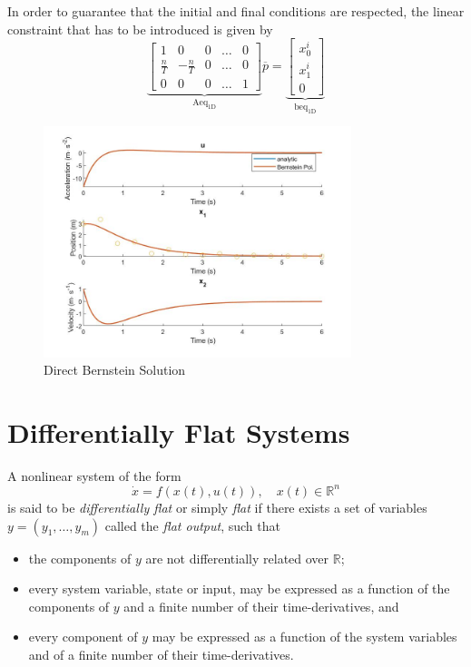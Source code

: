 \par In order to guarantee that the initial and final conditions are respected, the linear constraint that has to be introduced is given by
\begin{equation}
    \label{eq:bern_equality}
    \underbrace{\begin{bmatrix}
        1 & 0 & 0 & \dots & 0 \\
        \frac{n}{T} & -\frac{n}{T} & 0 & \dots & 0 \\
        0 & 0 & 0 & \dots & 1 \end{bmatrix}}_{\text{Aeq}_{\text{1D}}} \overline{p} =
    \underbrace{\begin{bmatrix}
        x_0^i \\ x_1^i \\ 0\end{bmatrix}}_{\text{beq}_{\text{1D}}}
\end{equation}


\begin{figure}[h!]
\centering
\includegraphics[width=0.8\textwidth]{Images/bernstein_1d.jpg}
\caption{Direct Bernstein Solution}
\label{fig:bernstein_1d}
\end{figure}

\section{Differentially Flat Systems}
\label{sec:differentiallyflatsystems}

\par A nonlinear system of the form
\begin{equation}
    \dot{x} = f(x(t),u(t)), \quad x(t) \in \mathbb{R}^n
\end{equation}
is said to be \textit{differentially flat} \cite{fliess1995flatness} or simply \textit{flat} if there exists a set of variables $y = (y_1, \dots, y_m)$ called the \textit{flat output}, such that
\begin{itemize}
    \item the components of $y$ are not differentially related over $\mathbb{R}$;
    \item every system variable, state or input, may be expressed as a function of the components of $y$ and a finite number of their time-derivatives, and 
    \item every component of $y$ may be expressed as a function of the system variables and of a finite number of their time-derivatives. 
\end{itemize}

